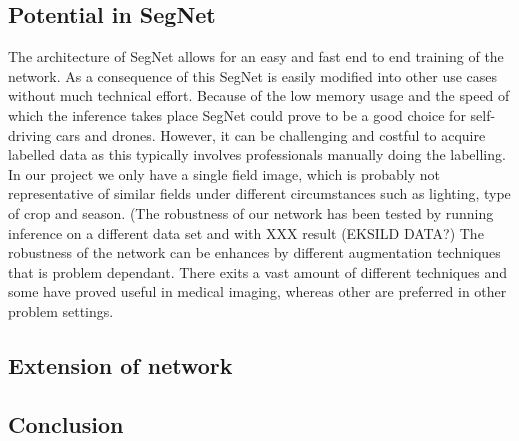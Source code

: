 \documentclass{article}
\begin{document}
\subsection{Potential in SegNet}
The architecture of SegNet allows for an easy and fast end to end training of the network. As a consequence of this SegNet is easily modified into other use cases without much technical effort. Because of the low memory usage and the speed of which the inference takes place SegNet could prove to be a good choice for self-driving cars and drones. However, it can be challenging and costful to acquire labelled data as this typically involves professionals manually doing the labelling. In our project we only have a single field image, which is probably not representative of similar fields under different circumstances such as lighting, type of crop and season. (The robustness of our network has been tested by running inference on a different data set and with XXX result (EKSILD DATA?)  The robustness of the network can be enhances by different augmentation techniques that is problem dependant. There exits a vast amount of different techniques and some have proved useful in medical imaging, whereas other are preferred in other problem settings. \cite{seg}

\subsection{Extension of network}


\subsection{Conclusion}


 
\end{document}
